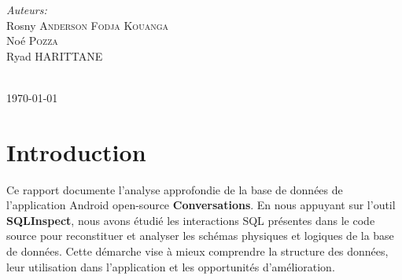 \documentclass[a4paper,11pt]{article}
\begin{document}
\begin{titlepage}

    \begin{minipage}{0.6\textwidth}
        \begin{flushleft} \large
            \emph{Auteurs:}\\
            Rosny  \textsc{Anderson Fodja Kouanga}\\
            Noé  \textsc{Pozza}\\
            Ryad  \textsc{HARITTANE}\\
            
        \end{flushleft}
       
        \begin{flushleft} \large
        \end{flushleft}

    \end{minipage}\\[2cm]



    {\large \today}\\[2cm] %

    \vfill %

\end{titlepage}

\newpage

\section*{Introduction}

Ce rapport documente l'analyse approfondie de la base de données de l'application Android open-source \textbf{Conversations}. En nous appuyant sur l'outil \textbf{SQLInspect}, nous avons étudié les interactions SQL présentes dans le code source pour reconstituer et analyser les schémas physiques et logiques de la base de données. Cette démarche vise à mieux comprendre la structure des données, leur utilisation dans l'application et les opportunités d'amélioration.
\end{document}
